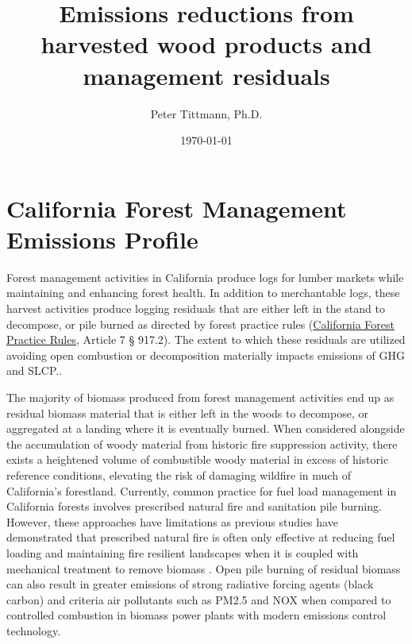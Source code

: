 \documentclass[a4paper]{article}
\author{Peter Tittmann, Ph.D.}
\date{\today}
\title{Emissions reductions from harvested wood products and management residuals}
\begin{document}
\maketitle
\tableofcontents

\pagebreak

\thispagestyle{empty}

\listoffigures

\listoftables

\newpage


\section{California Forest Management Emissions Profile}
\label{sec:orgheadline3}

Forest management activities in California produce logs for lumber markets while maintaining and enhancing forest health. In addition to merchantable logs, these harvest activities produce logging residuals that are either left in the stand to decompose, or pile burned as directed by forest practice rules (\href{http://calfire.ca.gov/resource_mgt/downloads/2013_FP_Rulebook_with_Tech_RuleNo1.pdf}{California Forest Practice Rules}, Article 7 §
917.2). The extent to which these residuals are utilized avoiding open combustion or decomposition materially impacts emissions of \ac{GHG} and \ac{SLCP}..

The majority of biomass produced from forest management activities end up as residual biomass material that is either left in the woods to decompose, or aggregated at a landing where it is eventually burned. When considered alongside the accumulation of woody material from historic fire suppression activity, there exists a heightened volume of combustible woody material in excess of historic reference conditions, elevating the risk of damaging wildfire in much of California’s forestland. Currently, common practice for fuel load management in California forests involves prescribed natural fire and sanitation pile burning. However, these approaches have limitations as previous studies have demonstrated that prescribed natural fire is often only effective at reducing fuel loading and maintaining fire resilient landscapes when it is coupled with mechanical treatment to remove biomass \cite{Stephens2009c}. Open pile burning of residual biomass can also result in greater emissions of strong radiative forcing agents (black carbon) and criteria air pollutants such as \ac{PM2.5} and \ac{NOX} when compared to controlled combustion in biomass power plants with modern emissions control technology. 
\end{document}
